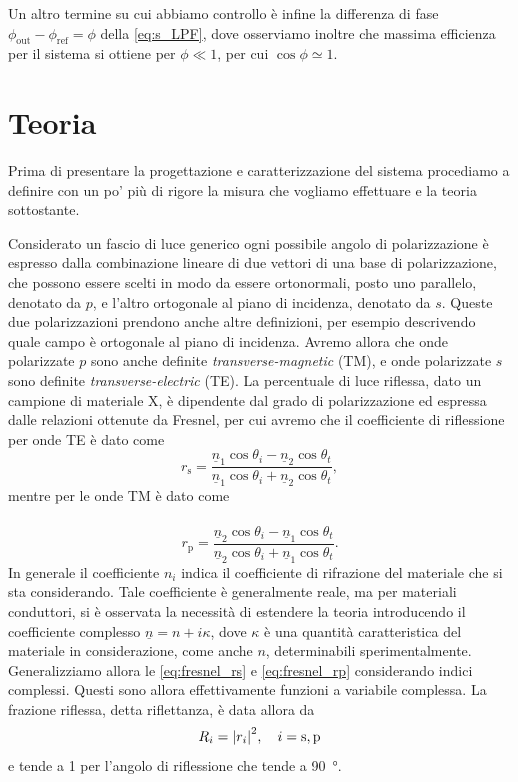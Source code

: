 \documentclass[prb,showpacs,floatfix,altaffilletter,amsmath,amssymb,reprint,citeautoscript,showkeys]{revtex4-1}
\begin{document}
Un altro termine su cui abbiamo controllo è infine la differenza di fase $\phi_\mathrm{out} - \phi_\mathrm{ref} = \phi$ della \eqref{eq:s_LPF}, dove osserviamo inoltre che massima efficienza per il sistema si ottiene per $\phi\ll 1$, per cui $\cos\phi\simeq1$.

\section{Teoria}

Prima di presentare la progettazione e caratterizzazione del sistema procediamo a definire con un po' più di rigore la misura che vogliamo effettuare e la teoria sottostante. 

Considerato un fascio di luce generico ogni possibile angolo di polarizzazione è espresso dalla combinazione lineare di due vettori di una base di polarizzazione, che possono essere scelti in modo da essere ortonormali, posto uno parallelo, denotato da $p$, e l'altro ortogonale al piano di incidenza, denotato da $s$. Queste due polarizzazioni prendono anche altre definizioni, per esempio descrivendo quale campo è ortogonale al piano di incidenza. Avremo allora che onde polarizzate $p$ sono anche definite \emph{transverse-magnetic} (TM), e onde polarizzate $s$ sono definite \emph{transverse-electric} (TE). La percentuale di luce riflessa, dato un campione di materiale X, è dipendente dal grado di polarizzazione ed espressa dalle relazioni ottenute da Fresnel\cite{fresnelCalculationTintsThat2021,fresnelNoteCalculTeintes1821}, per cui avremo che il coefficiente di riflessione per onde TE è dato come \begin{equation}
    r_\mathrm{s} = \frac{\underline{n}_1\cos\theta_i - \underline{n}_2\cos\theta_t}{\underline{n}_1\cos\theta_i + \underline{n}_2\cos\theta_t},
    \label{eq:fresnel_rs}
\end{equation} mentre per le onde TM è dato come \paragraph*{}\begin{equation}
    r_\mathrm{p} = \frac{\underline{n}_2\cos\theta_i - \underline{n}_1\cos\theta_t}{\underline{n}_2\cos\theta_i + \underline{n}_1\cos\theta_t}. 
    \label{eq:fresnel_rp}
\end{equation} In generale il coefficiente $n_i$ indica il coefficiente di rifrazione del materiale che si sta considerando. Tale coefficiente è generalmente reale, ma per materiali conduttori, si è osservata la necessità di estendere la teoria\cite{attwoodSoftXRaysExtreme1999} introducendo il coefficiente complesso $\underline n = n + i\kappa$, dove $\kappa$ è una quantità caratteristica del materiale in considerazione, come anche $n$, determinabili sperimentalmente. Generalizziamo allora le \eqref{eq:fresnel_rs} e \eqref{eq:fresnel_rp} considerando indici complessi. Questi sono allora effettivamente funzioni a variabile complessa. La frazione riflessa, detta riflettanza, è data allora da \begin{equation}
    R_i= \qty|r_i|^2, \quad i = \mathrm{s,p}
\end{equation} e tende a 1 per l'angolo di riflessione che tende a \SI{90}{\degree}.
\end{document}
